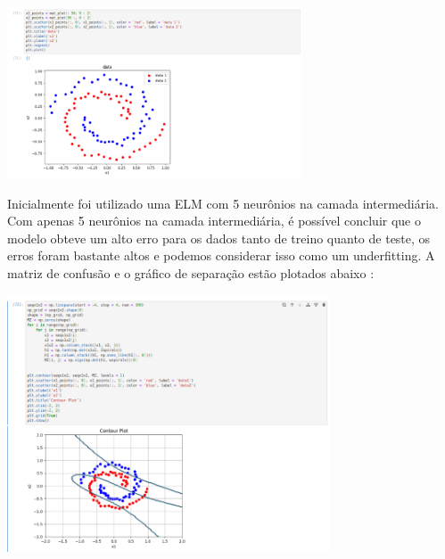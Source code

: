 \documentclass{article}
\begin{document}
\begin{center}

\includegraphics[height=2in]{exercise_pic/spirals/plot_graph_spirals.png}

\end{center}
\vspace{5pt}
Inicialmente foi utilizado uma ELM com 5 neurônios na camada intermediária. Com apenas 5 neurônios na camada intermediária, é possível concluir que o modelo obteve um alto erro para os dados tanto de treino quanto de teste, os erros foram bastante altos e podemos considerar isso como um underfitting. A matriz de confusão e o gráfico de separação estão plotados abaixo :

\begin{center}

\includegraphics[height=3in]{exercise_pic/spirals/plot_graph_sep_spirals_5.png}
\vspace{10pt}

\end{center}
\end{document}
